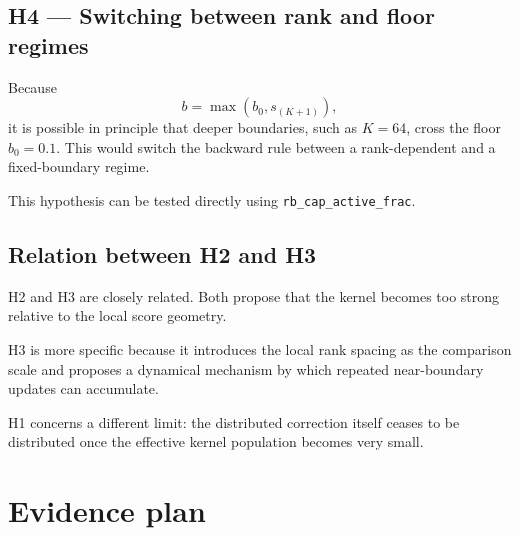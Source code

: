 \documentclass[11pt,a4paper]{article}
\newcommand{\code}[1]{\texttt{#1}}
\begin{document}
\subsection*{H4 --- Switching between rank and floor regimes}

Because
\[
b=\max(b_0,s_{(K+1)}),
\]
it is possible in principle that deeper boundaries, such as \(K=64\), cross
the floor \(b_0=0.1\). This would switch the backward rule between a
rank-dependent and a fixed-boundary regime.

This hypothesis can be tested directly using
\code{rb\_cap\_active\_frac}.

\subsection*{Relation between H2 and H3}

H2 and H3 are closely related.
Both propose that the kernel becomes too strong relative to the local score
geometry.

H3 is more specific because it introduces the local rank spacing as the
comparison scale and proposes a dynamical mechanism by which repeated
near-boundary updates can accumulate.

H1 concerns a different limit: the distributed correction itself ceases to be
distributed once the effective kernel population becomes very small.


\section{Evidence plan}
\end{document}
